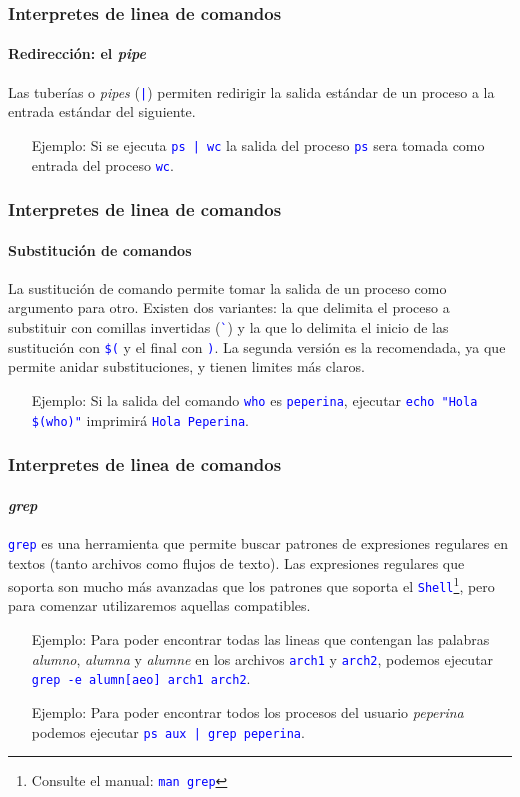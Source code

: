 \documentclass[11pt,a4paper,spanish]{beamer}
\newcommand{\cw}[1]{\mbox{\texttt{\textcolor{blue}{#1}}}}
\newcommand{\dq}[0]{\Verb+"+}
\begin{document}
\begin{frame}

    \frametitle{Interpretes de linea de comandos}
    \framesubtitle{Redirección: el \emph{pipe}}

    Las tuberías o \emph{pipes} (\cw{|}) permiten redirigir la salida
    estándar de un proceso a la entrada estándar del siguiente.

    \begin{itemize}
        \item[Ejemplo:] Si se ejecuta \cw{ps | wc} la salida del proceso
            \cw{ps} sera tomada como entrada del proceso \cw{wc}.
    \end{itemize}

\end{frame}

\begin{frame}

    \frametitle{Interpretes de linea de comandos}
    \framesubtitle{Substitución de comandos}

    La sustitución de comando permite tomar la salida de un proceso como
    argumento para otro. Existen dos variantes: la que delimita el proceso a
    substituir con comillas invertidas (\cw{\`{}}) y la que lo delimita
    el inicio de las sustitución con \cw{\$(} y el final con
    \cw{)}. La segunda versión es la recomendada, ya que permite
    anidar substituciones, y tienen limites más claros.

    \begin{itemize}
        \item[Ejemplo:] Si la salida del comando \cw{who} es
            \cw{peperina}, ejecutar \cw{echo \dq{}Hola
            \$(who)\dq{}} imprimirá \cw{Hola Peperina}.
    \end{itemize}

\end{frame}

\begin{frame}

    \frametitle{Interpretes de linea de comandos}
    \framesubtitle{\emph{grep}}

    \cw{grep} es una herramienta que permite buscar patrones de
    expresiones regulares en textos (tanto archivos como flujos de texto).
    Las expresiones regulares que soporta son mucho más avanzadas que los
    patrones que soporta el \cw{Shell}\footnote{Consulte el manual:
    \cw{man grep}}, pero para comenzar utilizaremos aquellas
    compatibles.

    \begin{itemize}
        \item[Ejemplo:] Para poder encontrar todas las lineas que contengan
            las palabras \emph{alumno}, \emph{alumna} y \emph{alumne} en los
            archivos \cw{arch1} y \cw{arch2}, podemos ejecutar
            \cw{grep -e alumn[aeo] arch1 arch2}.
        \item[Ejemplo:] Para poder encontrar todos los procesos del usuario
            \emph{peperina} podemos ejecutar \cw{ps aux | grep peperina}.
    \end{itemize}

\end{frame}
\end{document}

